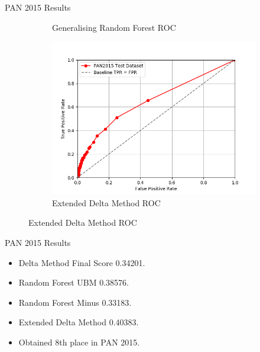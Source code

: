 \documentclass[10pt]{beamer}
\begin{document}
\begin{frame}[fragile]{PAN 2015 Results}
\begin{figure}
\begin{subfigure}{.4\textwidth}
            \caption{Generalising Random Forest ROC}
        \end{subfigure}
        \begin{subfigure}{.4\textwidth}
            \includegraphics[width=\textwidth]{../../report/pictures/extended_delta_method_roc.png}
            \caption{Extended Delta Method ROC}
        \end{subfigure}
    \end{figure}
\end{frame}

\begin{frame}[fragile]{PAN 2015 Results}

    \begin{itemize}
        \item Delta Method Final Score 0.34201.
        \item Random Forest UBM 0.38576.
        \item Random Forest Minus 0.33183.
        \item Extended Delta Method 0.40383.
        \item Obtained 8th place in PAN 2015.
    \end{itemize}

\end{frame}
\end{document}
